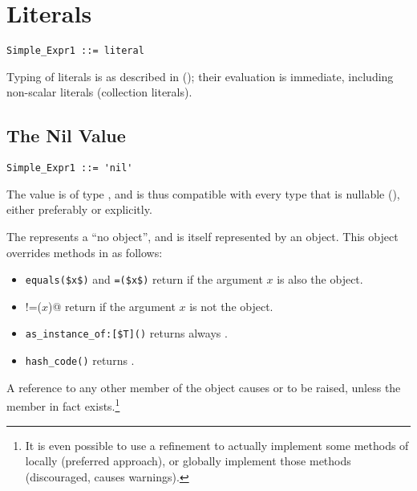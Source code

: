 \section{Literals}

\syntax\begin{lstlisting}
Simple_Expr1 ::= literal
\end{lstlisting}

Typing of literals is as described in (); their evaluation is immediate, including non-scalar literals (collection literals). 






\subsection{The Nil Value}

\syntax\begin{lstlisting}
Simple_Expr1 ::= 'nil'
\end{lstlisting}

The  value is of type , and is thus compatible with every type that is nullable (), either preferably or explicitly.

The  represents a ``no object'', and is itself represented by an object. This object overrides methods in  as follows: 
\begin{itemize}
\item 
\lstinline!equals($x$)! and \lstinline!=($x$)! return  if the argument $x$ is also the  object. 

\item 
\lstinline@!=($x$)@ return  if the argument $x$ is not the  object.

\item
\lstinline[mathescape=false]!as_instance_of:[$T]()! returns always . 

\item
\lstinline!hash_code()! returns . 
\end{itemize}

A reference to any other member of the  object causes  or  to be raised, unless the member in fact exists.\footnote{It is even possible to use a refinement to actually implement some methods of  locally (preferred approach), or globally implement those methods (discouraged, causes warnings).} 






